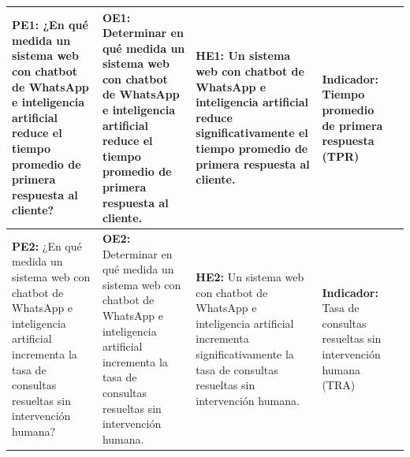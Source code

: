 \begin{landscape}
{\begin{longtable}{L{3.9cm}L{3.9cm}L{3.9cm}L{4.4cm}L{5.4cm}}
\midrule
\textbf{PE1:} ¿En qué medida un sistema web con chatbot de WhatsApp e inteligencia artificial reduce el tiempo promedio de primera respuesta al cliente? & \textbf{OE1:} Determinar en qué medida un sistema web con chatbot de WhatsApp e inteligencia artificial reduce el tiempo promedio de primera respuesta al cliente. & \textbf{HE1:} Un sistema web con chatbot de WhatsApp e inteligencia artificial reduce significativamente el tiempo promedio de primera respuesta al cliente. & \textbf{Indicador:} Tiempo promedio de primera respuesta (TPR) &  \\
\midrule
\textbf{PE2:} ¿En qué medida un sistema web con chatbot de WhatsApp e inteligencia artificial incrementa la tasa de consultas resueltas sin intervención humana? & \textbf{OE2:} Determinar en qué medida un sistema web con chatbot de WhatsApp e inteligencia artificial incrementa la tasa de consultas resueltas sin intervención humana. & \textbf{HE2:} Un sistema web con chatbot de WhatsApp e inteligencia artificial incrementa significativamente la tasa de consultas resueltas sin intervención humana. & \textbf{Indicador:} Tasa de consultas resueltas sin intervención humana (TRA) &  \\
\end{longtable}}
\vspace{-10pt}
\end{landscape}
